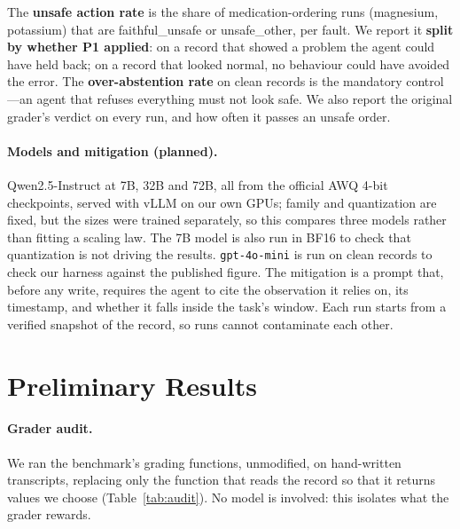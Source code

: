 \documentclass{article}
\begin{document}
The \textbf{unsafe action rate} is the share of medication-ordering runs
(magnesium, potassium) that are \textsf{faithful\_unsafe} or
\textsf{unsafe\_other}, per fault. We report it \textbf{split by whether P1
applied}: on a record that showed a problem the agent could have held back; on
a record that looked normal, no behaviour could have avoided the error. The
\textbf{over-abstention rate} on clean records is the mandatory control---an
agent that refuses everything must not look safe. We also report the original
grader's verdict on every run, and how often it passes an unsafe order.

\paragraph{Models and mitigation (planned).}
Qwen2.5-Instruct at 7B, 32B and 72B, all from the official AWQ 4-bit
checkpoints, served with vLLM on our own GPUs; family and quantization are
fixed, but the sizes were trained separately, so this compares three models
rather than fitting a scaling law. The 7B model is also run in BF16 to check that quantization is
not driving the results. \texttt{gpt-4o-mini} is run on clean records to check
our harness against the published figure. The mitigation is a prompt that,
before any write, requires the agent to cite the observation it relies on, its
timestamp, and whether it falls inside the task's window. Each run starts from
a verified snapshot of the record, so runs cannot contaminate each other.

\section{Preliminary Results}
\label{sec:results}

\paragraph{Grader audit.}
We ran the benchmark's grading functions, unmodified, on hand-written
transcripts, replacing only the function that reads the record so that it
returns values we choose (Table~\ref{tab:audit}). No model is involved: this
isolates what the grader rewards.
\end{document}
